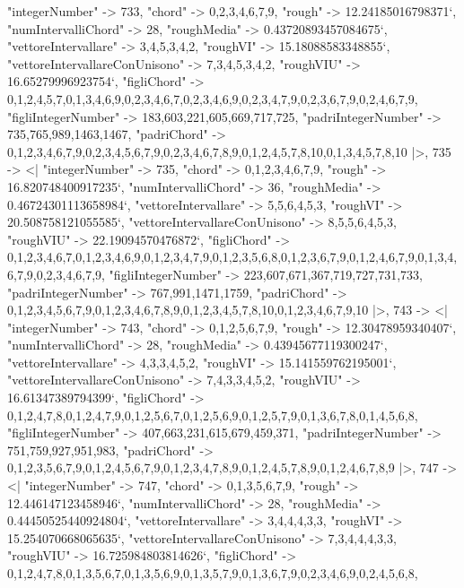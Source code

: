 \documentclass[
]{article}
\begin{document}
\begin{DatasetVerbatim}
    "integerNumber" -> 733,
    "chord" -> {0,2,3,4,6,7,9},
    "rough" -> 12.24185016798371`,
    "numIntervalliChord" -> 28,
    "roughMedia" -> 0.43720893457084675`,
    "vettoreIntervallare" -> {3,4,5,3,4,2},
    "roughVI" -> 15.18088583348855`,
    "vettoreIntervallareConUnisono" -> {7,3,4,5,3,4,2},
    "roughVIU" -> 16.65279996923754`,
    "figliChord" -> {{0,1,2,4,5,7},{0,1,3,4,6,9},{0,2,3,4,6,7},{0,2,3,4,6,9},{0,2,3,4,7,9},{0,2,3,6,7,9},{0,2,4,6,7,9}},
    "figliIntegerNumber" -> {183,603,221,605,669,717,725},
    "padriIntegerNumber" -> {735,765,989,1463,1467},
    "padriChord" -> {{0,1,2,3,4,6,7,9},{0,2,3,4,5,6,7,9},{0,2,3,4,6,7,8,9},{0,1,2,4,5,7,8,10},{0,1,3,4,5,7,8,10}}
  |>,
  735 -> <|
    "integerNumber" -> 735,
    "chord" -> {0,1,2,3,4,6,7,9},
    "rough" -> 16.820748400917235`,
    "numIntervalliChord" -> 36,
    "roughMedia" -> 0.46724301113658984`,
    "vettoreIntervallare" -> {5,5,6,4,5,3},
    "roughVI" -> 20.508758121055585`,
    "vettoreIntervallareConUnisono" -> {8,5,5,6,4,5,3},
    "roughVIU" -> 22.19094570476872`,
    "figliChord" -> {{0,1,2,3,4,6,7},{0,1,2,3,4,6,9},{0,1,2,3,4,7,9},{0,1,2,3,5,6,8},{0,1,2,3,6,7,9},{0,1,2,4,6,7,9},{0,1,3,4,6,7,9},{0,2,3,4,6,7,9}},
    "figliIntegerNumber" -> {223,607,671,367,719,727,731,733},
    "padriIntegerNumber" -> {767,991,1471,1759},
    "padriChord" -> {{0,1,2,3,4,5,6,7,9},{0,1,2,3,4,6,7,8,9},{0,1,2,3,4,5,7,8,10},{0,1,2,3,4,6,7,9,10}}
  |>,
  743 -> <|
    "integerNumber" -> 743,
    "chord" -> {0,1,2,5,6,7,9},
    "rough" -> 12.30478959340407`,
    "numIntervalliChord" -> 28,
    "roughMedia" -> 0.43945677119300247`,
    "vettoreIntervallare" -> {4,3,3,4,5,2},
    "roughVI" -> 15.141559762195001`,
    "vettoreIntervallareConUnisono" -> {7,4,3,3,4,5,2},
    "roughVIU" -> 16.61347389794399`,
    "figliChord" -> {{0,1,2,4,7,8},{0,1,2,4,7,9},{0,1,2,5,6,7},{0,1,2,5,6,9},{0,1,2,5,7,9},{0,1,3,6,7,8},{0,1,4,5,6,8}},
    "figliIntegerNumber" -> {407,663,231,615,679,459,371},
    "padriIntegerNumber" -> {751,759,927,951,983},
    "padriChord" -> {{0,1,2,3,5,6,7,9},{0,1,2,4,5,6,7,9},{0,1,2,3,4,7,8,9},{0,1,2,4,5,7,8,9},{0,1,2,4,6,7,8,9}}
  |>,
  747 -> <|
    "integerNumber" -> 747,
    "chord" -> {0,1,3,5,6,7,9},
    "rough" -> 12.446147123458946`,
    "numIntervalliChord" -> 28,
    "roughMedia" -> 0.44450525440924804`,
    "vettoreIntervallare" -> {3,4,4,4,3,3},
    "roughVI" -> 15.254070668065635`,
    "vettoreIntervallareConUnisono" -> {7,3,4,4,4,3,3},
    "roughVIU" -> 16.725984803814626`,
    "figliChord" -> {{0,1,2,4,7,8},{0,1,3,5,6,7},{0,1,3,5,6,9},{0,1,3,5,7,9},{0,1,3,6,7,9},{0,2,3,4,6,9},{0,2,4,5,6,8}},

\end{DatasetVerbatim}
\end{document}
